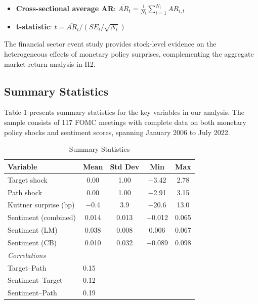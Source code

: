 \documentclass[12pt]{article}
\begin{document}
\begin{itemize}
\item \textbf{Cross-sectional average AR}: $\overline{AR}_t = \frac{1}{N_t} \sum_{i=1}^{N_t} AR_{i,t}$
\end{itemize}

\begin{itemize}
\item \textbf{t-statistic}: $t = \overline{AR}_t / (SE_t / \sqrt{N_t})$
\end{itemize}

The financial sector event study provides stock-level evidence on the heterogeneous effects of monetary policy surprises, complementing the aggregate market return analysis in H2.

\subsection{Summary Statistics}

Table 1 presents summary statistics for the key variables in our analysis. The sample consists of 117 FOMC meetings with complete data on both monetary policy shocks and sentiment scores, spanning January 2006 to July 2022.

\begin{table}[htbp]\centering\caption{Summary Statistics}\label{tab:summary}
\begin{tabular}{lcccc}\toprule
Variable & Mean & Std Dev & Min & Max \\\midrule
Target shock & 0.00 & 1.00 & $-$3.42 & 2.78 \\
Path shock & 0.00 & 1.00 & $-$2.91 & 3.15 \\
Kuttner surprise (bp) & $-$0.4 & 3.9 & $-$20.6 & 13.0 \\
Sentiment (combined) & 0.014 & 0.013 & $-$0.012 & 0.065 \\
Sentiment (LM) & 0.038 & 0.008 & 0.006 & 0.067 \\
Sentiment (CB) & 0.010 & 0.032 & $-$0.089 & 0.098 \\\midrule
\multicolumn{5}{l}{\textit{Correlations}} \\
Target--Path & \multicolumn{4}{l}{0.15} \\
Sentiment--Target & \multicolumn{4}{l}{0.12} \\
Sentiment--Path & \multicolumn{4}{l}{0.19} \\\bottomrule
\end{tabular}
\par\vspace{2pt}{\footnotesize Sample: 117 FOMC meetings, January 2006 to July 2022.}
\end{table}
\end{document}
